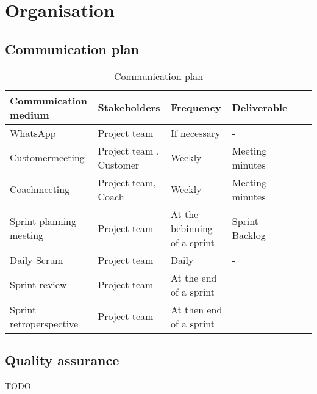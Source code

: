 \section{Organisation}

    \subsection{Communication plan}
    \begin{table}[H]
        \centering
        \begin{tabular}{l|l|l|l|l|l}
            \textbf{Communication medium} & \textbf{Stakeholders} & \textbf{Frequency} & \textbf{Deliverable} \\ \hline \hline
            WhatsApp & Project team & If necessary & - \\ \hline
            Customermeeting & Project team , Customer & Weekly & Meeting minutes \\ \hline
            Coachmeeting & Project team, Coach & Weekly & Meeting minutes \\ \hline
            Sprint planning meeting & Project team & At the bebinning of a sprint & Sprint Backlog \\ \hline
            Daily Scrum & Project team & Daily & - \\ \hline 
            Sprint review & Project team & At the end of a sprint & - \\ \hline
            Sprint retroperspective & Project team & At then end of a sprint & - \\ \hline
        \end{tabular}
        \caption{Communication plan}
    \end{table}

    \subsection{Quality assurance}
    TODO

